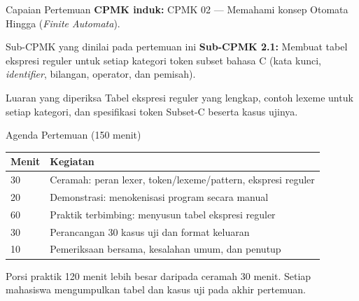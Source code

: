 \documentclass[aspectratio=169,10pt,t]{beamer}
\begin{document}

\begin{frame}{Capaian Pertemuan}
  \textbf{CPMK induk:} CPMK 02 --- Memahami konsep Otomata Hingga
  (\textit{Finite Automata}).

  \vspace{4pt}
  \begin{block}{Sub-CPMK yang dinilai pada pertemuan ini}
    \small
    \textbf{Sub-CPMK 2.1:} Membuat tabel ekspresi reguler untuk setiap
    kategori token subset bahasa C (kata kunci, \textit{identifier},
    bilangan, operator, dan pemisah).
  \end{block}

  \vspace{4pt}
  \begin{exampleblock}{Luaran yang diperiksa}
    \footnotesize
    Tabel ekspresi reguler yang lengkap, contoh lexeme untuk setiap
    kategori, dan spesifikasi token Subset-C beserta kasus ujinya.
  \end{exampleblock}
\end{frame}

\begin{frame}{Agenda Pertemuan (150 menit)}
  \small
  \begin{tabular}{@{}p{1.4cm}p{12.3cm}@{}}
    \toprule
    \textbf{Menit} & \textbf{Kegiatan} \\
    \midrule
    30 & Ceramah: peran lexer, token/lexeme/pattern, ekspresi reguler \\
    20 & Demonstrasi: menokenisasi program secara manual \\
    60 & Praktik terbimbing: menyusun tabel ekspresi reguler \\
    30 & Perancangan 30 kasus uji dan format keluaran \\
    10 & Pemeriksaan bersama, kesalahan umum, dan penutup \\
    \bottomrule
  \end{tabular}

  \vspace{6pt}
  {\scriptsize\color{ubbblue!75}Porsi praktik 120 menit lebih besar
  daripada ceramah 30 menit. Setiap mahasiswa mengumpulkan tabel dan
  kasus uji pada akhir pertemuan.}
\end{frame}
\end{document}
